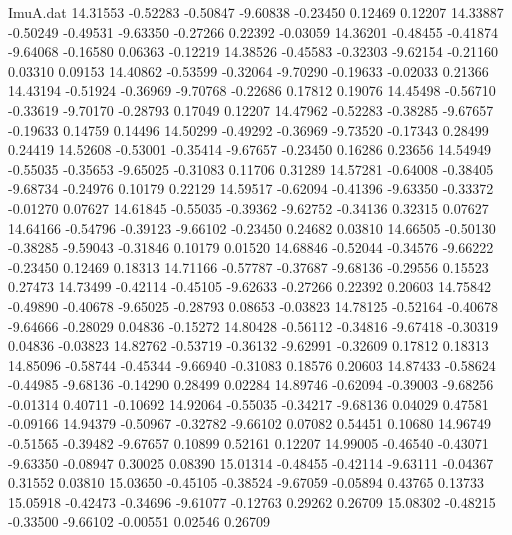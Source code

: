 \begin{filecontents}{ImuA.dat}
  14.31553   -0.52283   -0.50847   -9.60838   -0.23450    0.12469    0.12207
  14.33887   -0.50249   -0.49531   -9.63350   -0.27266    0.22392   -0.03059
  14.36201   -0.48455   -0.41874   -9.64068   -0.16580    0.06363   -0.12219
  14.38526   -0.45583   -0.32303   -9.62154   -0.21160    0.03310    0.09153
  14.40862   -0.53599   -0.32064   -9.70290   -0.19633   -0.02033    0.21366
  14.43194   -0.51924   -0.36969   -9.70768   -0.22686    0.17812    0.19076
  14.45498   -0.56710   -0.33619   -9.70170   -0.28793    0.17049    0.12207
  14.47962   -0.52283   -0.38285   -9.67657   -0.19633    0.14759    0.14496
  14.50299   -0.49292   -0.36969   -9.73520   -0.17343    0.28499    0.24419
  14.52608   -0.53001   -0.35414   -9.67657   -0.23450    0.16286    0.23656
  14.54949   -0.55035   -0.35653   -9.65025   -0.31083    0.11706    0.31289
  14.57281   -0.64008   -0.38405   -9.68734   -0.24976    0.10179    0.22129
  14.59517   -0.62094   -0.41396   -9.63350   -0.33372   -0.01270    0.07627
  14.61845   -0.55035   -0.39362   -9.62752   -0.34136    0.32315    0.07627
  14.64166   -0.54796   -0.39123   -9.66102   -0.23450    0.24682    0.03810
  14.66505   -0.50130   -0.38285   -9.59043   -0.31846    0.10179    0.01520
  14.68846   -0.52044   -0.34576   -9.66222   -0.23450    0.12469    0.18313
  14.71166   -0.57787   -0.37687   -9.68136   -0.29556    0.15523    0.27473
  14.73499   -0.42114   -0.45105   -9.62633   -0.27266    0.22392    0.20603
  14.75842   -0.49890   -0.40678   -9.65025   -0.28793    0.08653   -0.03823
  14.78125   -0.52164   -0.40678   -9.64666   -0.28029    0.04836   -0.15272
  14.80428   -0.56112   -0.34816   -9.67418   -0.30319    0.04836   -0.03823
  14.82762   -0.53719   -0.36132   -9.62991   -0.32609    0.17812    0.18313
  14.85096   -0.58744   -0.45344   -9.66940   -0.31083    0.18576    0.20603
  14.87433   -0.58624   -0.44985   -9.68136   -0.14290    0.28499    0.02284
  14.89746   -0.62094   -0.39003   -9.68256   -0.01314    0.40711   -0.10692
  14.92064   -0.55035   -0.34217   -9.68136    0.04029    0.47581   -0.09166
  14.94379   -0.50967   -0.32782   -9.66102    0.07082    0.54451    0.10680
  14.96749   -0.51565   -0.39482   -9.67657    0.10899    0.52161    0.12207
  14.99005   -0.46540   -0.43071   -9.63350   -0.08947    0.30025    0.08390
  15.01314   -0.48455   -0.42114   -9.63111   -0.04367    0.31552    0.03810
  15.03650   -0.45105   -0.38524   -9.67059   -0.05894    0.43765    0.13733
  15.05918   -0.42473   -0.34696   -9.61077   -0.12763    0.29262    0.26709
  15.08302   -0.48215   -0.33500   -9.66102   -0.00551    0.02546    0.26709

\end{filecontents}
